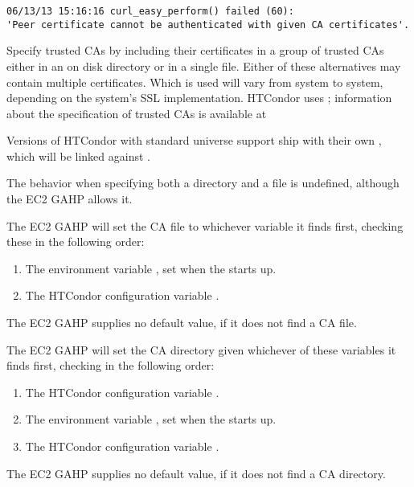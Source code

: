 \footnotesize
\begin{verbatim}
06/13/13 15:16:16 curl_easy_perform() failed (60):
'Peer certificate cannot be authenticated with given CA certificates'.
\end{verbatim}
\normalsize

Specify trusted CAs by including their certificates in a group of trusted CAs
either in an on disk directory or in a single file.
Either of these alternatives may contain multiple certificates.
Which is used will vary from system to system,
depending on the system's SSL implementation.
HTCondor uses ;
information about the  specification of trusted CAs
is available at


Versions of HTCondor with standard universe support ship with their
own , which will be linked against .

The behavior when specifying both a directory and a file is undefined,
although the EC2 GAHP allows it.

The EC2 GAHP will set the CA file to whichever variable it finds first,
checking these in the following order:

\begin{enumerate}
\item The environment variable ,
  set when the  starts up.
\item The HTCondor configuration variable .
\end{enumerate}

The EC2 GAHP supplies no default value, if it does not find a CA file.

The EC2 GAHP will set the CA directory given whichever of these
variables it finds first, checking in the following order:

\begin{enumerate}
\item The HTCondor configuration variable .
\item The environment variable ,
  set when the  starts up.
\item The HTCondor configuration variable .
\end{enumerate}

The EC2 GAHP supplies no default value, if it does not find a CA directory.

